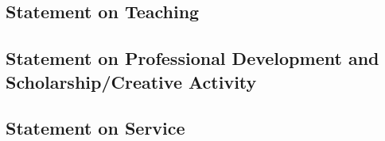 \subsection*{Statement on Teaching}


\newpage


\newpage
\subsection*{Statement on Professional Development and Scholarship/Creative Activity}


\newpage
\subsection*{Statement on Service}

